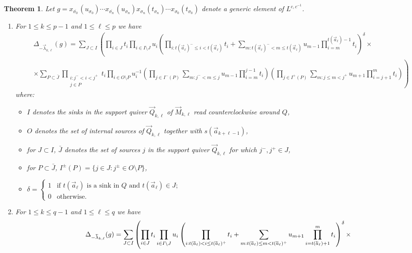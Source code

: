 \documentclass[11pt]{amsart}
\newcommand{\scev}[1]{\reflectbox{\scriptsize\!\ensuremath{\vec{\,\reflectbox{\ensuremath{#1}}}}}}
\newtheorem{theorem}{Theorem}[section]
\numberwithin{equation}{section}
\begin{document}
  {%
  \begin{theorem}
    Let $g=x_{\overline{\sigma_0\!}\,}(u_{\sigma_0})\cdots x_{\overline{\sigma_n\!}\,}(u_{\sigma_n}) x_{\sigma_n}(t_{\sigma_n}) \cdots x_{\sigma_0}(t_{\sigma_0})$ denote a generic element of $L^{c,c^{-1}}$.
    \begin{enumerate}
      \item For $1\le k\le p-1$ and $1\le\ell\le p$ we have
      \begin{align}
        &\Delta_{-\vec{\lambda}_{k,\ell}}(g)=\sum_{J\subset I}\left(\prod_{i\in J} t_i\prod_{i\in I\setminus J} u_i\left(\prod_{i:t(\vec{a}_\ell)^-\le i<t(\vec{a}_\ell)}t_i+\sum_{m:t(\vec{a}_\ell)^-<m\le t(\vec{a}_\ell)}u_{m-1}\prod_{i=m}^{t(\vec{a}_\ell)-1} t_i\right)^\delta\times\right.\\
        \nonumber&\times\left.\sum_{P\subset\bar{J}}\prod_{\substack{i:j^-<i<j^+\\j\in P}}t_i\prod_{i\in O\setminus P}u_i^{-1}\left(\prod_{j\in I^-(P)}\sum_{m:j^-<m\le j}u_{m-1}\prod_{i=m}^{j-1} t_i\right)\left(\prod_{j\in I^+(P)}\sum_{m:j\le m<j^+}u_{m+1}\prod_{i=j+1}^{m} t_i\right)\right)
      \end{align}
      where:
      \begin{itemize}
        \item $I$ denotes the sinks in the support quiver $\vec{Q}_{k,\ell}$ of $\vec{M}_{k,\ell}$ read counterclockwise around $Q$,
        \item $O$ denotes the set of internal sources of $\vec{Q}_{k,\ell}$ together with $s(\vec{a}_{k+\ell-1})$,
        \item for $J\subset I$, $\bar{J}$ denotes the set of sources $j$ in the support quiver $\vec{Q}_{k,\ell}$ for which $j^-,j^+\in J$,
        \item for $P\subset\bar{J}$, $I^\pm(P)=\{j\in J:j^\pm\in O\setminus P\}$,
        \item $\delta=\begin{cases}1 & \text{if $t(\vec{a}_\ell)$ is a sink in $Q$ and $t(\vec{a}_\ell)\in J$;}\\0 & \text{otherwise.}\end{cases}$
      \end{itemize}
      \item For $1\le k\le q-1$ and $1\le\ell\le q$  we have
      \begin{align}
        &\Delta_{-\scev{\lambda}_{k,\ell}}(g)=\sum_{J\subset I}\left(\prod_{i\in J} t_i\prod_{i\in I\setminus J} u_i\left(\prod_{i:t(\scev{a}_\ell)<i\le t(\scev{a}_\ell)^+}t_i+\sum_{m:t(\scev{a}_\ell)\le m<t(\scev{a}_\ell)^+}u_{m+1}\prod_{i=t(\scev{a}_\ell)+1}^m t_i\right)^\delta\times\right.\\

\end{align}
\end{enumerate}
\end{theorem}}
\end{document}

